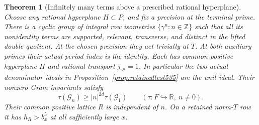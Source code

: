 \documentclass[a4paper,11pt]{article}
\newtheorem{theorem}[proposition]{Theorem}
\theoremstyle{definition}
\theoremstyle{remark}
\newcommand{\RR}{\mathbb R}\newcommand{\CC}{\mathbb C}\newcommand{\QQ}{\mathbb Q}
\newcommand{\ZZ}{\mathbb Z}\newcommand{\ord}{\operatorname{ord}}
\numberwithin{equation}{section}
\begin{document}
\begin{theorem}[Infinitely many terms above a prescribed rational hyperplane]
\leavevmode\label{thm:everydiagonal536}
Choose any rational hyperplane \(H\subset P\), and fix a
precision at the terminal prime. There is a cyclic group of
integral row isometries \(\{\gamma^n:n\in\ZZ\}\) such that
all its nonidentity terms are supported, relevant, transverse,
and distinct in the lifted double quotient. At the chosen
precision they act trivially at \(T\). At both auxiliary primes
their actual period index is the identity. Each has common
positive hyperplane \(H\) and rational transport \(j_{\gamma^n}=1\).
In particular the two actual denominator ideals in
Proposition~\ref{prop:retainedtest535} are the unit ideal.
Their nonzero Gram invariants satisfy
\[
        \tau(\mathcal G_n)\ge |n|^{2d}\tau(\mathcal G_1)
                \qquad(\tau:F\hookrightarrow\RR,\ n\ne0).
\]
Their common positive lattice \(R\) is independent of \(n\).
On a retained norm-\(T\) row it has \(h_R>b_x^5\) at all
sufficiently large \(x\).
\end{theorem}
\end{document}
